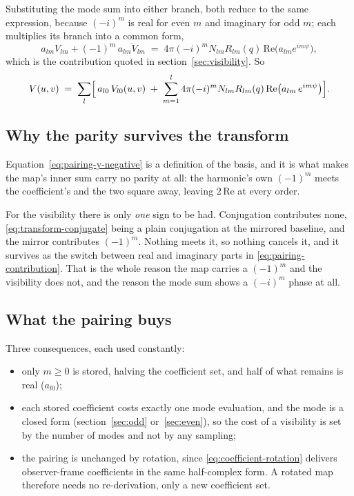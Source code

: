 Substituting the mode sum into either branch, both reduce to the same expression, because
$(-i)^m$ is real for even $m$ and imaginary for odd $m$; each multiplies its branch into a
common form,
\begin{equation}
  a_{lm}V_{lm} + (-1)^m\,\overline{a_{lm}V_{lm}}
  \;=\; 4\pi(-i)^m N_{lm}R_{lm}(q)\,\mathrm{Re}\bigl(a_{lm}e^{im\psi}\bigr) ,
  \label{eq:pairing-compact}
\end{equation}
which is the contribution quoted in section~\ref{sec:visibility}.  So
\begin{equation}
  V(u,v) \;=\; \sum_{l}\Bigl[\, a_{l0}\,V_{l0}(u,v)
    \;+\; \sum_{m=1}^{l} 4\pi(-i)^m N_{lm}R_{lm}(q)\,
      \mathrm{Re}\bigl( a_{lm}\,e^{im\psi} \bigr) \Bigr] .
  \label{eq:pairing-visibility-real}
\end{equation}

\subsection{Why the parity survives the transform}
\label{sec:pairing-why}

Equation~\eqref{eq:pairing-y-negative} is a definition of the basis, and it is what makes the
map's inner sum carry no parity at all: the harmonic's own $(-1)^m$ meets the coefficient's
and the two square away, leaving $2\,\mathrm{Re}$ at every order.

For the visibility there is only \emph{one} sign to be had.  Conjugation contributes none,
\eqref{eq:transform-conjugate} being a plain conjugation at the mirrored baseline, and the
mirror contributes $(-1)^m$.  Nothing meets it, so nothing cancels it, and it survives as the
switch between real and imaginary parts in \eqref{eq:pairing-contribution}.  That is the whole
reason the map carries a $(-1)^m$ and the visibility does not, and the reason the mode sum
shows a $(-i)^m$ phase at all.

\subsection{What the pairing buys}
\label{sec:pairing-buys}

Three consequences, each used constantly:

\begin{itemize}
  \item only $m \ge 0$ is stored, halving the coefficient set, and half of what remains is
    real ($a_{l0}$);
  \item each stored coefficient costs exactly one mode evaluation, and the mode is a closed
    form (section~\ref{sec:odd} or~\ref{sec:even}), so the cost of a visibility is set by
    the number of modes and not by any sampling;
  \item the pairing is unchanged by rotation, since \eqref{eq:coefficient-rotation} delivers
    observer-frame coefficients in the same half-complex form.  A rotated map therefore
    needs no re-derivation, only a new coefficient set.
\end{itemize}

